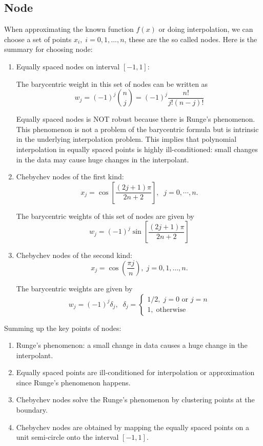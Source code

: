 \subsection{Node}
When approximating the known function $f(x)$ or doing interpolation, we can choose a set of points $x_i,\;i=0,1,...,n$, these are the so called nodes. Here is the summary for choosing node:

\begin{enumerate}
	\item 
	Equally spaced nodes on interval $[-1,1]$: 
	
	The barycentric weight in this set of nodes can be written as 
	\[ w_j = (-1)^j \binom{n}{j} = (-1)^j \frac{n!}{j!(n-j)!} \]
	\begin{warning}
		Equally spaced nodes is NOT robust because there is Runge's phenomenon. This phenomenon is not a problem of the barycentric formula but is intrinsic in the underlying interpolation problem. This implies that polynomial interpolation in equally spaced points is highly ill-conditioned: small changes in the data may cause huge changes in the interpolant.
	\end{warning}
	
	\item
	Chebychev nodes of the first kind:
	\[ x_j = \cos\left[ \frac{(2j+1)\pi}{2n+2} \right] ,\;\;j=0,\cdots,n. \]
	
	The barycentric weights of this set of nodes are given by
	\[ w_j = (-1)^j \sin\left[ \frac{(2j+1)\pi}{2n+2}\right] \]
	 
	\item 
	Chebychev nodes of the second kind: 
	\[ x_j = \cos\left(\frac{\pi j}{n}\right), \; j=0,1,...,n.\]
	
	The barycentric weights are given by
	\[ w_j = (-1)^j\delta_j,\;\; \delta_j = \begin{cases}
	1/2,\;\text{$j=0$ or $j=n$}\\
	1,\;\text{otherwise}
	\end{cases} \]
\end{enumerate}

\begin{summary}
	Summing up the key points of nodes:
	\begin{enumerate}
		\item 
		Runge's phenomenon: a small change in data causes a huge change in the interpolant.
		
		\item 
		Equally spaced points are ill-conditioned for interpolation or approximation since Runge's phenomenon happens.
		
		\item 
		Chebychev nodes solve the Runge's phenomenon by clustering points at the boundary.
		
		\item
		Chebychev nodes are obtained by mapping the equally spaced points on a unit semi-circle onto the interval $[-1,1]$.
	\end{enumerate}
	
\end{summary}

